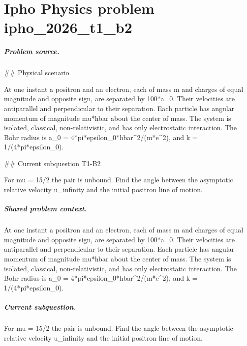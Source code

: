 
\chapter{Ipho Physics problem ipho\_2026\_t1\_b2}
\label{ch:IPhO2026Problems_problem_ipho_2026_t1_b2}

\paragraph{Problem source.}
\#\# Physical scenario

At one instant a positron and an electron, each of mass m and charges of equal
magnitude and opposite sign, are separated by 100*a\_0.  Their velocities are
antiparallel and perpendicular to their separation.  Each particle has angular
momentum of magnitude mu*hbar about the center of mass.  The system is isolated,
classical, non-relativistic, and has only electrostatic interaction.  The Bohr
radius is a\_0 = 4*pi*epsilon\_0*hbar\textasciicircum{}2/(m*e\textasciicircum{}2), and k = 1/(4*pi*epsilon\_0).

\#\# Current subquestion T1-B2

For mu = 15/2 the pair is unbound. Find the angle between the asymptotic relative velocity u\_infinity and the initial positron line of motion.

\paragraph{Shared problem context.}
At one instant a positron and an electron, each of mass m and charges of equal
magnitude and opposite sign, are separated by 100*a\_0.  Their velocities are
antiparallel and perpendicular to their separation.  Each particle has angular
momentum of magnitude mu*hbar about the center of mass.  The system is isolated,
classical, non-relativistic, and has only electrostatic interaction.  The Bohr
radius is a\_0 = 4*pi*epsilon\_0*hbar\textasciicircum{}2/(m*e\textasciicircum{}2), and k = 1/(4*pi*epsilon\_0).

\paragraph{Current subquestion.}
For mu = 15/2 the pair is unbound. Find the angle between the asymptotic relative velocity u\_infinity and the initial positron line of motion.

